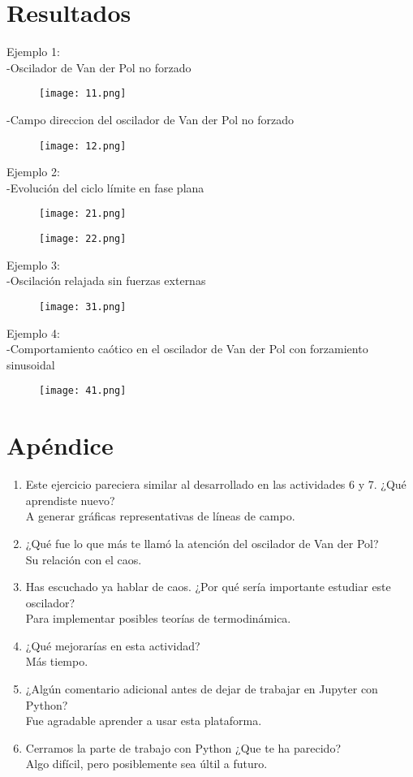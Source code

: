 \documentclass{article}
\begin{document}
\section{Resultados}
Ejemplo 1:
\\-Oscilador de Van der Pol no forzado
\begin{figure}[H]
\texttt{[image: 11.png]}
\end{figure}
-Campo direccion del oscilador de Van der Pol no forzado
\begin{figure}[H]
\texttt{[image: 12.png]}
\end{figure}
Ejemplo 2:
\\-Evolución del ciclo límite en fase plana
\begin{figure}[H]
\texttt{[image: 21.png]}
\end{figure}
\begin{figure}[H]
\texttt{[image: 22.png]}
\end{figure}
Ejemplo 3:
\\-Oscilación relajada sin fuerzas externas
\begin{figure}[H]
\texttt{[image: 31.png]}
\end{figure}
Ejemplo 4:
\\-Comportamiento caótico en el oscilador de Van der Pol con forzamiento sinusoidal
\begin{figure}[H]
\texttt{[image: 41.png]}
\end{figure}
\section{Apéndice}
\begin{enumerate}
\item Este ejercicio pareciera similar al desarrollado en las actividades 6 y 7. ¿Qué aprendiste nuevo?
\\A generar gráficas representativas de líneas de campo.
\item ¿Qué fue lo que más te llamó la atención del oscilador de Van der Pol?
\\Su relación con el caos.
\item Has escuchado ya hablar de caos. ¿Por qué sería importante estudiar este oscilador?
\\Para implementar posibles teorías de termodinámica.
\item ¿Qué mejorarías en esta actividad?
\\Más tiempo.
\item ¿Algún comentario adicional antes de dejar de trabajar en Jupyter con Python?
\\Fue agradable aprender a usar esta plataforma.
\item Cerramos la parte de trabajo con Python ¿Que te ha parecido?
\\Algo difícil, pero posiblemente sea últil a futuro.
\end{enumerate}
\end{document}
